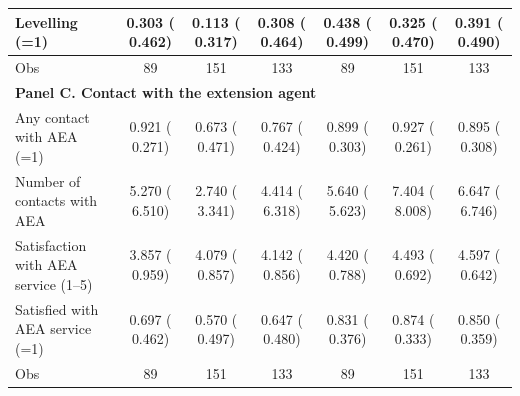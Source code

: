 \begin{tabular}{lcccccc}
Levelling (=1) &     0.303 (    0.462) &     0.113 (    0.317) &     0.308 (    0.464) &     0.438 (    0.499) &     0.325 (    0.470) &     0.391 (    0.490) \\
\midrule
Obs &        89 &       151 &       133 &        89 &       151 &       133 \\
\midrule
\multicolumn{7}{l}{\textbf{Panel C. Contact with the extension agent}} \\
Any contact with AEA (=1) &     0.921 (    0.271) &     0.673 (    0.471)\sym{**} &     0.767 (    0.424)\sym{***} &     0.899 (    0.303) &     0.927 (    0.261) &     0.895 (    0.308) \\
Number of contacts with AEA &     5.270 (    6.510) &     2.740 (    3.341) &     4.414 (    6.318) &     5.640 (    5.623) &     7.404 (    8.008) &     6.647 (    6.746) \\
Satisfaction with AEA service (1--5) &     3.857 (    0.959) &     4.079 (    0.857)\sym{*} &     4.142 (    0.856)\sym{*} &     4.420 (    0.788) &     4.493 (    0.692)\sym{**} &     4.597 (    0.642)\sym{*} \\
Satisfied with AEA service (=1) &     0.697 (    0.462) &     0.570 (    0.497) &     0.647 (    0.480) &     0.831 (    0.376) &     0.874 (    0.333) &     0.850 (    0.359) \\
\midrule
Obs &        89 &       151 &       133 &        89 &       151 &       133 \\
\bottomrule
\end{tabular}
